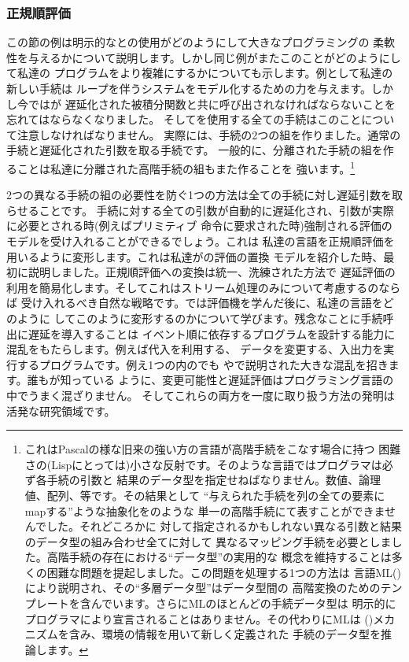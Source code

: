 \subsubsection*{正規順評価}

この節の例は明示的なとの使用がどのようにして大きなプログラミングの
柔軟性を与えるかについて説明します。しかし同じ例がまたこのことがどのようにして私達の
プログラムをより複雑にするかについても示します。例として私達の新しい手続は
ループを伴うシステムをモデル化するための力を与えます。しかし今ではが
遅延化された被積分関数と共に呼び出されなければならないことを忘れてはならなくなりました。
そしてを使用する全ての手続はこのことについて注意しなければなりません。
実際には、手続の2つの組を作りました。通常の手続と遅延化された引数を取る手続です。
一般的に、分離された手続の組を作ることは私達に分離された高階手続の組もまた作ることを
強います。\footnote{これはPascalの様な旧来の強い方の言語が高階手続をこなす場合に持つ
困難さの(Lispにとっては)小さな反射です。そのような言語ではプログラマは必ず各手続の引数と
結果のデータ型を指定せねばなりません。数値、論理値、配列、等です。その結果として
``与えられた手続を列の全ての要素にmapする''ような抽象化をのような
単一の高階手続にて表すことができませんでした。それどころかに
対して指定されるかもしれない異なる引数と結果のデータ型の組み合わせ全てに対して
異なるマッピング手続を必要としました。高階手続の存在における``データ型''の実用的な
概念を維持することは多くの困難な問題を提起しました。この問題を処理する1つの方法は
言語ML()により説明され、その``多層データ型''はデータ型間の
高階変換のためのテンプレートを含んでいます。さらにMLのほとんどの手続データ型は
明示的にプログラマにより宣言されることはありません。その代わりにMLは
()メカニズムを含み、環境の情報を用いて新しく定義された
手続のデータ型を推論します。}


2つの異なる手続の組の必要性を防ぐ1つの方法は全ての手続に対し遅延引数を取らせることです。
手続に対する全ての引数が自動的に遅延化され、引数が実際に必要とされる時(例えばプリミティブ
命令に要求された時)強制される評価のモデルを受け入れることができるでしょう。これは
私達の言語を正規順評価を用いるように変形します。これは私達がの評価の置換
モデルを紹介した時、最初に説明しました。正規順評価への変換は統一、洗練された方法で
遅延評価の利用を簡易化します。そしてこれはストリーム処理のみについて考慮するのならば
受け入れるべき自然な戦略です。では評価機を学んだ後に、私達の言語をどのように
してこのように変形するのかについて学びます。残念なことに手続呼出に遅延を導入することは
イベント順に依存するプログラムを設計する能力に混乱をもたらします。例えば代入を利用する、
データを変更する、入出力を実行するプログラムです。例え1つの内のでも
やで説明された大きな混乱を招きます。誰もが知っている
ように、変更可能性と遅延評価はプログラミング言語の中でうまく混ざりません。
そしてこれらの両方を一度に取り扱う方法の発明は活発な研究領域です。

